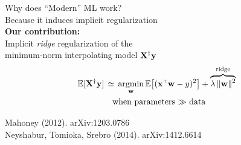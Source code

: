 \documentclass[8pt]{beamer}
\begin{document}
\begin{frame}
\begin{columns}
\begin{column}{0.53\textwidth}
Why does ``Modern'' ML work?\\
Because it induces implicit regularization\\[10mm]
\textbf{Our contribution:}\\
Implicit \textit{ridge} regularization of the\\
minimum-norm interpolating model $\mathbf X^\dagger\mathbf y$
\vspace{3mm}
  \begin{align*}
    \E[\X^\dagger\y]
    &\,\simeq\,
      \argmin_\w\E\big[(\x^\top\w-y)^2\big] + \overbrace{\lambda
    \,\|\w\|^2}^{\text{ridge}}\\
&\quad\text{when parameters $\gg$ data}
  \end{align*}
  \vspace{7mm}

  {\footnotesize
    Mahoney (2012). arXiv:1203.0786\\
    Neyshabur, Tomioka, Srebro (2014). arXiv:1412.6614\\
    }
\end{column}
\end{columns}
\pause\pause
\end{frame}
\end{document}
